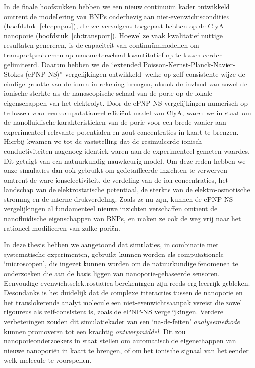 In de finale hoofstukken hebben we een nieuw continu\"{u}m kader ontwikkeld omtrent de modellering van BNPs
onderhevig aan niet-evenwichtscondities (hoofdstuk~\ref{ch:epnpns}), die we vervolgens toegepast hebben op de
ClyA nanoporie (hoofdstuk~\ref{ch:transport}). Hoewel ze vaak kwalitatief nuttige resultaten genereren, is
de capaciteit van continu\"{u}mmodellen om transportproblemen op nanometerschaal kwantitatief op te lossen
eerder gelimiteerd. Daarom hebben we de ``extended Poisson-Nernst-Planck-Navier-Stokes ({ePNP-NS})''
vergelijkingen ontwikkeld, welke op zelf-consistente wijze de eindige grootte van de ionen in rekening
brengen, alsook de invloed van zowel de ionische sterkte als de nanoscopische schaal van de porie op de lokale
eigenschappen van het elektrolyt. Door de {ePNP-NS} vergelijkingen numerisch op te lossen voor een
computationeel effici\"{e}nt model van ClyA, waren we in staat om de nanofluidische karakteristieken van de
porie voor een brede waaier aan experimenteel relevante potentialen en zout concentraties in kaart te brengen.
Hierbij kwamen we tot de vaststelling dat de gesimuleerde ionisch conductiviteiten nagenoeg identiek waren aan
de experimenteel gemeten waardes. Dit getuigt van een natuurkundig nauwkeurig model. Om deze reden hebben we
onze simulaties dan ook gebruikt om gedetailleerde inzichten te verwerven omtrent de ware ionselectiviteit, de
verdeling van de ion concentraties, het landschap van de elektrostatische potentiaal, de sterkte van de
elektro-osmotische stroming en de interne drukverdeling. Zoals ze nu zijn, kunnen de {ePNP-NS} vergelijkingen
al fundamenteel nieuwe inzichten verschaffen omtrent de nanofluidische eigenschappen van BNPs, en maken ze ook
de weg vrij naar het rationeel modificeren van zulke pori\"{e}n.

In deze thesis hebben we aangetoond dat simulaties, in combinatie met systematische experimenten, gebruikt
kunnen worden als computationele `microscopen', die ingezet kunnen worden om de natuurkundige fenomenen te
onderzoeken die aan de basis liggen van nanoporie-gebaseerde sensoren. Eenvoudige evenwichtselektrostatica
berekeningen zijn reeds erg leerrijk gebleken. Desondanks is het duidelijk dat de complexe interacties tussen
de nanoporie en het translokerende analyt molecule een niet-evenwichtsaanpak vereist die zowel rigoureus als
zelf-consistent is, zoals de {ePNP-NS} vergelijkingen. Verdere verbeteringen zouden dit simulatiekader van een
`na-de-feiten' \emph{analysemethode} kunnen promoveren tot een krachtig \emph{ontwerpmiddel}. Dit zou
nanoporieonderzoekers in staat stellen om automatisch de eigenschappen van nieuwe nanopori\"{e}n in kaart te
brengen, of om het ionische signaal van het eender welk molecule te voorspellen.


\cleardoublepage

